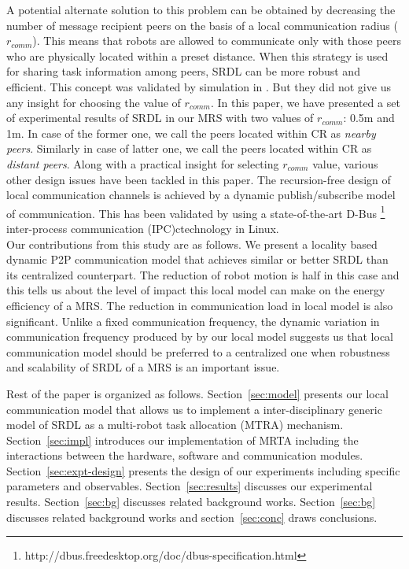 \documentclass[letterpaper, 10 pt, conference]{ieeeconf}  %
\begin{document}
A potential alternate solution to this problem can be obtained by decreasing the number of message recipient peers on the basis of a local communication radius ($r_{comm}$). This means that robots are allowed to communicate only with those peers who are physically located within a preset distance. When this strategy is used for sharing task information among peers, SRDL can be more robust and efficient. This concept was validated by simulation in \cite{Agassounon}. But they did not give us any insight for choosing the value of $r_{comm}$. In this paper, we have presented a set of experimental results of SRDL in our MRS with two values of $r_{comm}$: 0.5m and 1m. In case of the former one, we call the peers located within CR as {\em nearby peers}. Similarly in case of latter one, we call the peers located within CR as {\em distant peers}. Along with a practical insight for selecting $r_{comm}$ value, various other design issues have been tackled in this paper. The recursion-free design of  local communication channels is achieved by a dynamic publish/subscribe model of communication. This has been validated by using a state-of-the-art D-Bus \footnote{http://dbus.freedesktop.org/doc/dbus-specification.html} inter-process communication (IPC)ctechnology in Linux.\\
Our contributions from this study are as follows. We present a locality based dynamic P2P communication model that achieves similar or better SRDL than its centralized counterpart. The reduction of robot motion is half in this case and this tells us about the level of impact this local model can make on the energy efficiency of a MRS. The reduction in communication load in local model  is also significant.  Unlike a fixed communication frequency, the dynamic variation in communication frequency produced by by our local model suggests us that local communication model should be preferred to a centralized one when robustness and scalability of SRDL of a MRS is an important issue.

Rest of the paper is organized as follows.  Section~\ref{sec:model} presents our local communication model that allows us to implement a inter-disciplinary generic model of SRDL as a multi-robot task allocation (MTRA) mechanism. Section~\ref{sec:impl} introduces our implementation of MRTA including the interactions between the hardware, software and communication modules. Section~\ref{sec:expt-design} presents the design of our experiments including specific parameters and observables. Section~\ref{sec:results} discusses our experimental results. Section~\ref{sec:bg} discusses related background works. Section~\ref{sec:bg} discusses related background works and section~\ref{sec:conc} draws conclusions.
%
\end{document}

